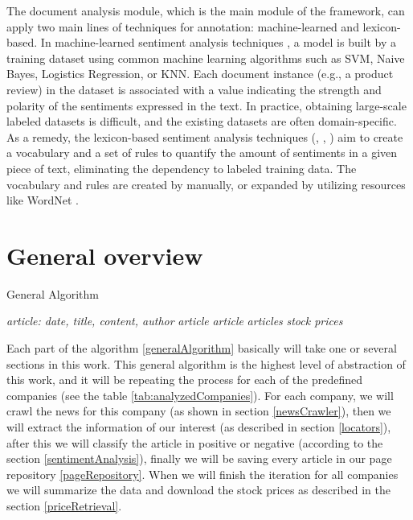 	The document analysis module, which is the main module of the framework, can apply two main lines of techniques for annotation: machine-learned and lexicon-based. In machine-learned sentiment analysis techniques \cite{P2002}, a model is built by a training dataset using common machine learning algorithms such as SVM, Naive Bayes, Logistics Regression, or KNN. Each document instance (e.g., a product review) in the dataset is associated with a value indicating the strength and polarity of the sentiments expressed in the text. In practice, obtaining large-scale labeled datasets is difficult, and the existing datasets are often domain-specific. As a remedy, the lexicon-based sentiment analysis techniques (\cite{B2010}, \cite{T2010}, \cite{TB2011}) aim to create a vocabulary and a set of rules to quantify the amount of sentiments in a given piece of text, eliminating the dependency to labeled training data. The vocabulary and rules are created by manually, or expanded by utilizing resources like WordNet \cite{M1995}.
	
		
	\section{General overview}
	
\begin{algorithm}
\caption{General Algorithm}\label{generalAlgorithm}
\begin{algorithmic}[1]
	\STATE {}
	\STATE {} \textit{article: date, title, content, author}\text{;}
	\STATE {} \textit{article}\text{;}
	\STATE {} \textit{article}\text{;}
\ENDFOR
\STATE {} \textit{articles}\text{;}
\STATE {} \textit{stock prices}\text{;}
\end{algorithmic}
\end{algorithm}

Each part of the algorithm \ref{generalAlgorithm} basically will take one or several sections in this work. This general algorithm is the highest level of abstraction of this work, and it will be repeating the process for each of the predefined companies (see the table \ref{tab:analyzedCompanies}). For each company, we will crawl the news for this company (as shown in section \ref{newsCrawler}), then we will extract the information of our interest (as described in section \ref{locators}), after this we will classify the article in positive or negative (according to the section \ref{sentimentAnalysis}), finally we will be saving every article in our page repository \ref{pageRepository}. When we will finish the iteration for all companies we will summarize the data and download the stock prices as described in the section \ref{priceRetrieval}.
	
